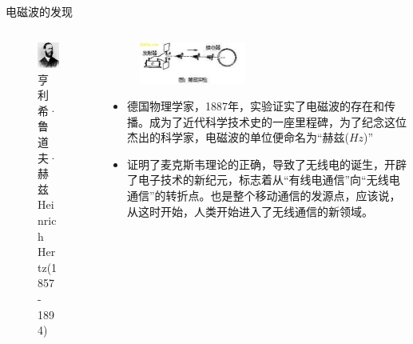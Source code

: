 \begin{frame}{电磁波的发现}
 \begin{columns}
  \begin{column}{0.35\linewidth}
   \begin{figure}
    \includegraphics[width=3.5cm]{hertz.jpg}
    \caption{亨利希·鲁道夫·赫兹 Heinrich Hertz(1857 - 1894)}
   \end{figure}
  \end{column}
  \begin{column}{0.65\linewidth}
   \begin{figure}
    \flushright
    \includegraphics[width=3.5cm]{hertzexperiment.jpg}
   \end{figure}
   \begin{itemize}
    \item 德国物理学家，1887年，实验证实了电磁波的存在和传播。成为了近代科学技术史的一座里程碑，为了纪念这位杰出的科学家，电磁波的单位便命名为“赫兹($Hz$)”
    \item 证明了麦克斯韦理论的正确，导致了无线电的诞生，开辟了电子技术的新纪元，标志着从“有线电通信”向“无线电通信”的转折点。也是整个移动通信的发源点，应该说，从这时开始，人类开始进入了无线通信的新领域。
   \end{itemize}
  \end{column}
 \end{columns}
\end{frame}

